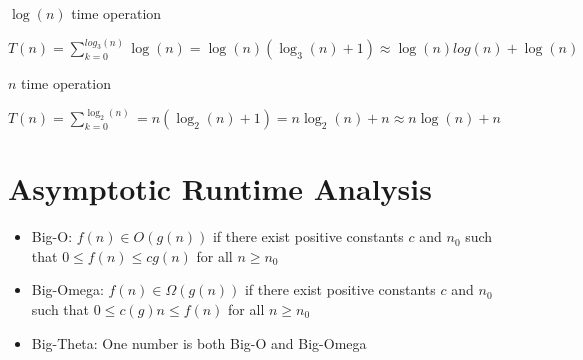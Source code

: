 \begin{multicols}{2}
  \noindent \hrulefill
  \begin{algorithmic}[1]
    \State $\log (n)$ time operation
    \EndFor
  \end{algorithmic}
  \noindent \hrulefill

  $T(n) = \sum_{k=0}^{log_{3} (n)} \log (n) = \log (n) (\log_{3} (n) + 1) \approx \log (n) log (n) + \log (n)$

  \columnbreak

  \noindent \hrulefill
  \begin{algorithmic}[1]
    \State $n$ time operation
    \EndFor
  \end{algorithmic}
  \noindent \hrulefill

  $T(n) = \sum_{k=0}^{\log_{2} (n)} = n(\log_{2} (n) + 1) = n \log_{2} (n) + n \approx n \log (n) + n$
\end{multicols}

\section{Asymptotic Runtime Analysis}

\begin{itemize}
  \item Big-O: $f(n) \in O(g(n))$ if there exist positive constants $c$ and $n_0$ such that $0 \leq f(n) \leq cg(n)$ for all $n \geq n_0$
  \item Big-Omega: $f(n) \in \Omega(g(n))$ if there exist positive constants $c$ and $n_0$ such that $0 \leq c(g)n \leq f(n)$ for all $n \geq n_0$
  \item Big-Theta: One number is both Big-O and Big-Omega
\end{itemize}

